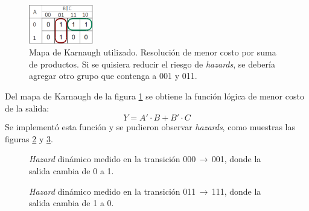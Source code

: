 \documentclass[../../e3_tp2_main.tex]{subfiles}
\begin{document}
\begin{figure}[H]	%
	\centering
	\includegraphics[width=0.25\textwidth]{kmap.png}
	\caption{Mapa de Karnaugh utilizado. Resoluci\'on de menor costo por suma de productos. Si se quisiera reducir el riesgo de \textit{hazards}, se deber\'ia agregar otro grupo que contenga a 001 y 011.}
	\label{fig:ej_3_kmap}
\end{figure}

Del mapa de Karnaugh de la figura \ref{fig:ej_3_kmap} se obtiene la funci\'on l\'ogica de menor costo de la salida:
$$Y = A'\cdot B+B'\cdot C$$
Se implement\'o esta funci\'on y se pudieron observar \textit{hazards}, como muestras las figuras \ref{fig:ej_3_up_haz} y \ref{fig:ej_3_down_haz}\protect\footnotemark. 

\begin{figure}[H]	%
	\centering
	\caption{\textit{Hazard} din\'amico medido en la transici\'on 000\,$\rightarrow$\,001, donde la salida cambia de 0 a 1.}
	\label{fig:ej_3_up_haz}
\end{figure}


\begin{figure}[H]	%
	\centering
	\caption{\textit{Hazard} din\'amico medido en la transici\'on 011\,$\rightarrow$\,111, donde la salida cambia de 1 a 0.}
	\label{fig:ej_3_down_haz}
\end{figure}



\end{document}

